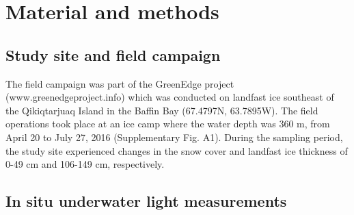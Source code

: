 \section{Material and methods}

\subsection{Study site and field campaign}

The field campaign was part of the GreenEdge project (www.greenedgeproject.info) which was conducted on landfast ice southeast of the Qikiqtarjuaq Island in the Baffin Bay (67.4797N, 63.7895W). The field operations took place at an ice camp where the water depth was 360 m, from April 20 to July 27, 2016 (Supplementary Fig. A1). During the sampling period, the study site experienced changes in the snow cover and landfast ice thickness of 0-49 cm and 106-149 cm, respectively.

\subsection{In situ underwater light measurements}

